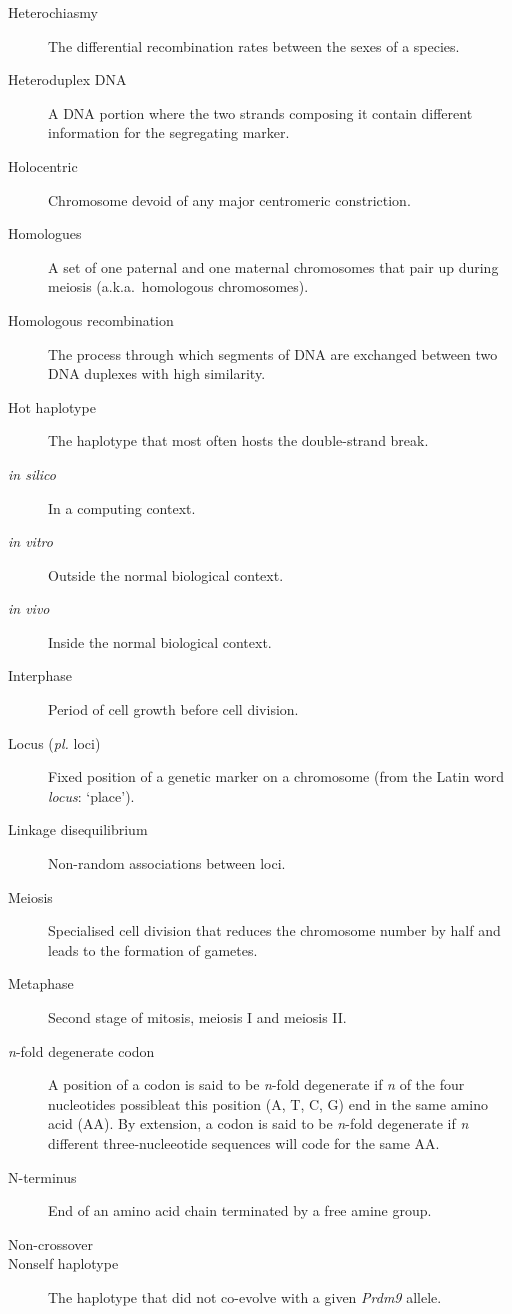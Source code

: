 \begin{alwayssingle}
\begin{description}
		\item[Heterochiasmy] The differential recombination rates between the sexes of a species.
		\item[Heteroduplex DNA] A DNA portion where the two strands composing it contain different information for the segregating marker.
		\item[Holocentric] Chromosome devoid of any major centromeric constriction. 
		\item[Homologues] A set of one paternal and one maternal chromosomes that pair up during meiosis (a.k.a.\ homologous chromosomes).
		\item[Homologous recombination] The process through which segments of DNA are exchanged between two DNA duplexes with high  similarity.
		\item[Hot haplotype] The haplotype that most often hosts the double-strand break.
		\item[\textit{in silico}] In a computing context.
		\item[\textit{in vitro}] Outside the normal biological context.
		\item[\textit{in vivo}] Inside the normal biological context.
		\item[Interphase] Period of cell growth before cell division.
		\item[Locus (\textit{pl.} loci)] Fixed position of a genetic marker on a chromosome (from the Latin word \textit{locus}: ‘place’).
		\item[Linkage disequilibrium] Non-random associations between loci.
		\item[Meiosis] Specialised cell division that reduces the chromosome number by half and leads to the formation of gametes.
		\item[Metaphase] Second stage of mitosis, meiosis I and meiosis II\@.
		\item[\textit{n}-fold degenerate codon] A position of a codon is said to be \textit{n}-fold degenerate if \textit{n} of the four nucleotides possibleat this position (A, T, C, G) end in the same amino acid (AA). By extension, a codon is said to be \textit{n}-fold degenerate if \textit{n} different three-nucleeotide sequences will code for the same AA\@.
		\item[N-terminus] End of an amino acid chain terminated by a free amine group.
		\item[Non-crossover] 
		\item[Nonself haplotype] The haplotype that did not co-evolve with a given \textit{Prdm9} allele.

\end{description}
\end{alwayssingle}
